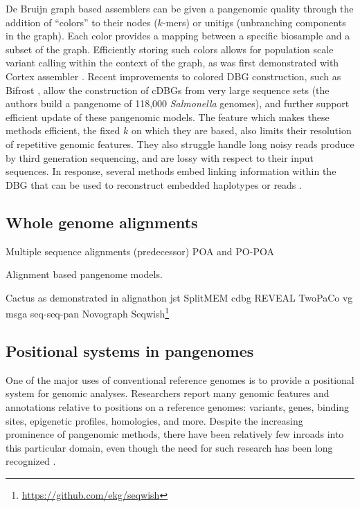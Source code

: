 De Bruijn graph based assemblers can be given a pangenomic quality through the addition of ``colors'' to their nodes ($k$-mers) or unitigs (unbranching components in the graph).
Each color provides a mapping between a specific biosample and a subset of the graph.
Efficiently storing such colors allows for population scale variant calling within the context of the graph, as was first demonstrated with Cortex assembler \cite{Iqbal_2012}.
Recent improvements to colored DBG construction, such as Bifrost \cite{holley2019bifrost}, allow the construction of cDBGs from very large sequence sets (the authors build a pangenome of 118,000 \emph{Salmonella} genomes), and further support efficient update of these pangenomic models.
The feature which makes these methods efficient, the fixed $k$ on which they are based, also limits their resolution of repetitive genomic features.
They also struggle handle long noisy reads produce by third generation sequencing, and are lossy with respect to their input sequences.
In response, several methods embed linking information within the DBG that can be used to reconstruct embedded haplotypes or reads \cite{Bolger_2017,Turner_2018}.

\subsection{Whole genome alignments}

Multiple sequence alignments (predecessor) POA and PO-POA \cite{Lee_2002,Grasso_2004} %

Alignment based pangenome models.

Cactus \cite{Paten_2011} as demonstrated in alignathon \cite{earl2014alignathon}
jst \cite{Rahn_2014}
SplitMEM \cite{Marcus_2014}
cdbg \cite{Baier_2015}
REVEAL \cite{linthorst2015scalable}
TwoPaCo \cite{Minkin_2016}
vg msga \cite{Novak_2017a,Garrison_2018,Garrison_2019}
seq-seq-pan \cite{Jandrasits_2018}
Novograph \cite{Biederstedt2018}
Seqwish\footnote{\url{https://github.com/ekg/seqwish}} \cite{Garrison_2019}


\subsection{Positional systems in pangenomes}

One of the major uses of conventional reference genomes is to provide a positional system for genomic analyses.
Researchers report many genomic features and annotations relative to positions on a reference genomes: variants, genes, binding sites, epigenetic profiles, homologies, and more.
Despite the increasing prominence of pangenomic methods, there have been relatively few inroads into this particular domain, even though the need for such research has been long recognized \cite{computational2016computational}. 

